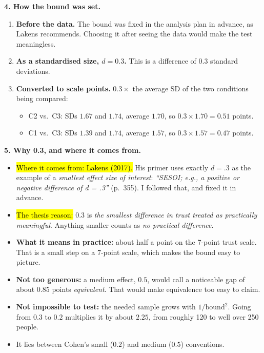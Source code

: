 \documentclass[11pt,a4paper]{article}
\newcommand{\key}[1]{\hl{#1}}
\begin{document}
\textbf{4. How the bound was set.}
\begin{enumerate}[leftmargin=1.4em,itemsep=0.1em,topsep=0.2em]
  \item \textbf{Before the data.} The bound was fixed in the analysis plan in advance, as Lakens recommends. Choosing it after seeing the data would make the test meaningless.
  \item \textbf{As a standardised size, $d=0.3$.} This is a difference of 0.3 standard deviations.
  \item \textbf{Converted to scale points.} $0.3\times$ the average SD of the two conditions being compared:
  \begin{itemize}[itemsep=0em,topsep=0.1em]
    \item C2 vs.\ C3: SDs $1.67$ and $1.74$, average $1.70$, so $0.3\times1.70=\mathbf{0.51}$ points.
    \item C1 vs.\ C3: SDs $1.39$ and $1.74$, average $1.57$, so $0.3\times1.57=\mathbf{0.47}$ points.
  \end{itemize}
\end{enumerate}

\textbf{5. Why 0.3, and where it comes from.}
\begin{itemize}
  \item \key{Where it comes from: Lakens (2017).} His primer uses exactly $d=.3$ as the example of a \emph{smallest effect size of interest}: \emph{``SESOI; e.g., a positive or negative difference of d = .3''} (p.~355). I followed that, and fixed it in advance.
  \item \key{The thesis reason:} $0.3$ is \emph{the smallest difference in trust treated as practically meaningful}. Anything smaller counts as \emph{no practical difference}.
  \item \textbf{What it means in practice:} about half a point on the 7-point trust scale. That is a small step on a 7-point scale, which makes the bound easy to picture.
  \item \textbf{Not too generous:} a medium effect, $0.5$, would call a noticeable gap of about 0.85 points \emph{equivalent}. That would make equivalence too easy to claim.
  \item \textbf{Not impossible to test:} the needed sample grows with $1/\text{bound}^2$. Going from $0.3$ to $0.2$ multiplies it by about $2.25$, from roughly 120 to well over 250 people.
  \item It lies between Cohen's small ($0.2$) and medium ($0.5$) conventions.
\end{itemize}
\end{document}
